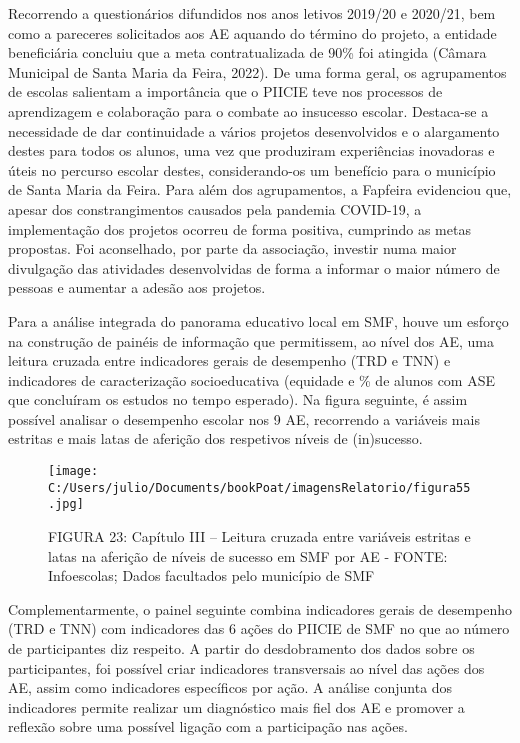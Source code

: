 \documentclass[
]{book}
\begin{document}
Recorrendo a questionários difundidos nos anos letivos 2019/20 e 2020/21, bem como a pareceres solicitados aos AE aquando do término do projeto, a entidade beneficiária concluiu que a meta contratualizada de 90\% foi atingida (Câmara Municipal de Santa Maria da Feira, 2022). De uma forma geral, os agrupamentos de escolas salientam a importância que o PIICIE teve nos processos de aprendizagem e colaboração para o combate ao insucesso escolar. Destaca-se a necessidade de dar continuidade a vários projetos desenvolvidos e o alargamento destes para todos os alunos, uma vez que produziram experiências inovadoras e úteis no percurso escolar destes, considerando-os um benefício para o município de Santa Maria da Feira. Para além dos agrupamentos, a Fapfeira evidenciou que, apesar dos constrangimentos causados pela pandemia COVID-19, a implementação dos projetos ocorreu de forma positiva, cumprindo as metas propostas. Foi aconselhado, por parte da associação, investir numa maior divulgação das atividades desenvolvidas de forma a informar o maior número de pessoas e aumentar a adesão aos projetos.

Para a análise integrada do panorama educativo local em SMF, houve um esforço na construção de painéis de informação que permitissem, ao nível dos AE, uma leitura cruzada entre indicadores gerais de desempenho (TRD e TNN) e indicadores de caracterização socioeducativa (equidade e \% de alunos com ASE que concluíram os estudos no tempo esperado). Na figura seguinte, é assim possível analisar o desempenho escolar nos 9 AE, recorrendo a variáveis mais estritas e mais latas de aferição dos respetivos níveis de (in)sucesso.

\begin{figure}
\centering
\texttt{[image: C:/Users/julio/Documents/bookPoat/imagensRelatorio/figura55.jpg]}
\caption{FIGURA 23: Capítulo III -- Leitura cruzada entre variáveis estritas e latas na aferição de níveis de sucesso em SMF por AE - FONTE: Infoescolas; Dados facultados pelo município de SMF}
\end{figure}

Complementarmente, o painel seguinte combina indicadores gerais de desempenho (TRD e TNN) com indicadores das 6 ações do PIICIE de SMF no que ao número de participantes diz respeito. A partir do desdobramento dos dados sobre os participantes, foi possível criar indicadores transversais ao nível das ações dos AE, assim como indicadores específicos por ação. A análise conjunta dos indicadores permite realizar um diagnóstico mais fiel dos AE e promover a reflexão sobre uma possível ligação com a participação nas ações.
\end{document}
